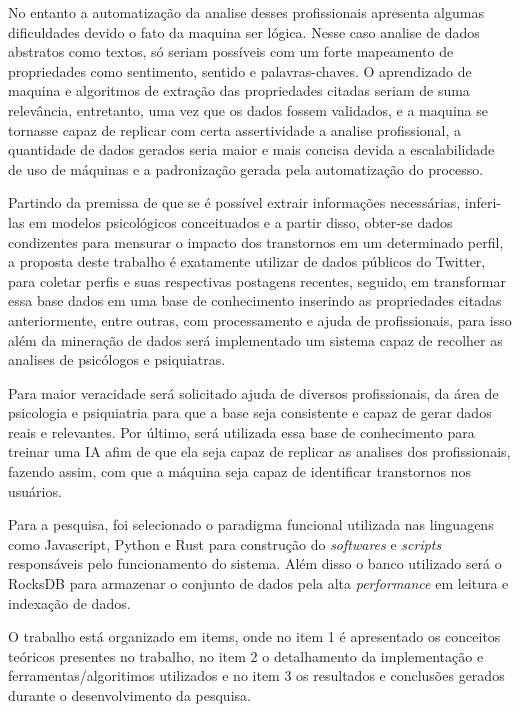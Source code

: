 No entanto a automatização da analise desses profissionais apresenta algumas dificuldades devido o fato da maquina ser lógica. Nesse caso analise de dados abstratos como textos, só seriam possíveis com um forte mapeamento de propriedades como sentimento, sentido e palavras-chaves. O aprendizado de maquina e algoritmos de extração das propriedades citadas seriam de suma relevância, entretanto, uma vez que os dados fossem validados, e a maquina se tornasse capaz de replicar com certa assertividade a analise profissional, a quantidade de dados gerados seria maior e mais concisa devida a escalabilidade de uso de máquinas e a padronização gerada pela automatização do processo.

Partindo da premissa de que se é possível extrair informações necessárias, inferi-las em modelos psicológicos conceituados e a partir disso, obter-se dados condizentes para mensurar o impacto dos transtornos em um determinado perfil, a proposta deste trabalho é exatamente utilizar de dados públicos do Twitter, para coletar perfis e suas respectivas postagens recentes, seguido, em transformar essa base dados em uma base de conhecimento inserindo as propriedades citadas anteriormente, entre outras, com processamento e ajuda de profissionais, para isso além da mineração de dados será implementado um sistema capaz de recolher as analises de psicólogos e psiquiatras.

Para maior veracidade será solicitado ajuda de diversos profissionais, da área de psicologia e psiquiatria para que a base seja consistente e capaz de gerar dados reais e relevantes. Por último, será utilizada essa base de conhecimento para treinar uma IA afim de que ela seja capaz de replicar as analises dos profissionais, fazendo assim, com que a máquina seja capaz de identificar transtornos nos usuários.

Para a pesquisa, foi selecionado o paradigma funcional utilizada nas linguagens como Javascript, Python e Rust para construção do \textit{softwares} e \textit{scripts} responsáveis pelo funcionamento do sistema. Além disso o banco utilizado será o RocksDB para armazenar o conjunto de dados pela alta \textit{performance} em leitura e indexação de dados.

O trabalho está organizado em items, onde no item 1 é apresentado os conceitos teóricos presentes no trabalho, no item 2 o detalhamento da implementação e ferramentas/algoritimos utilizados e no item 3 os resultados e conclusões gerados durante o desenvolvimento da pesquisa.

